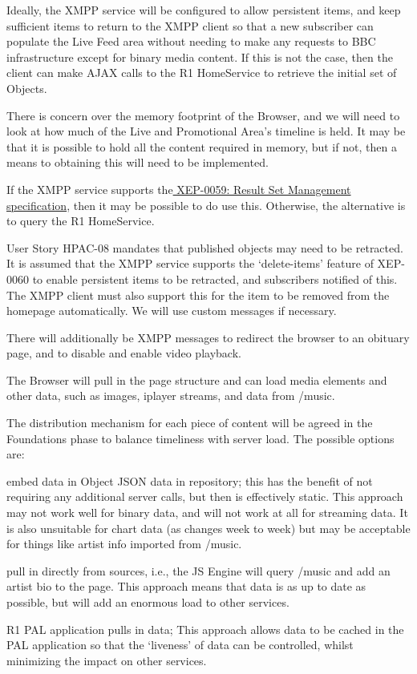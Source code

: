 \documentclass[a4paper, 11pt]{scrreprt}
\begin{document}
Ideally, the XMPP service will be configured to allow persistent items, and keep sufficient items to return to the XMPP client so that a new subscriber can populate the Live Feed area without needing to make any requests to BBC infrastructure except for binary media content. If this is not the case, then the client can make AJAX calls to the R1 HomeService to retrieve the initial set of Objects.

There is concern over the memory footprint of the Browser, and we will need to look at how much of the Live and Promotional Area’s timeline is held. It may be that it is possible to hold all the content required in memory, but if not, then a means to obtaining this will need to be implemented.

If the XMPP service supports the\href{http://www.google.com/url?q=http%3A%2F%2Fxmpp.org%2Fextensions%2Fxep-0059.html&sa=D&sntz=1&usg=AFQjCNHFNftwelaBrA3SHSvujhwXTNrtYA}{ XEP-0059: Result Set Management specification}, then it may be possible to do use this. Otherwise, the alternative is to query the R1 HomeService.

User Story HPAC-08 mandates that published objects may need to be retracted. It is assumed that the XMPP service supports the ‘delete-items’ feature of XEP-0060 to enable persistent items to be retracted, and subscribers notified of this. The XMPP client must also support this for the item to be removed from the homepage automatically. We will use custom messages if necessary.

There will additionally be XMPP messages to redirect the browser to an obituary page, and to disable and enable video playback.

The Browser will pull in the page structure and can load media elements and other data, such as images, iplayer streams, and data from /music.

The distribution mechanism for each piece of content will be agreed in the Foundations phase to balance timeliness with server load. The possible options are:



\begin{tystrul}


\item embed data in Object JSON data in repository; this has the benefit of not requiring any additional server calls, but then is effectively static. This approach may not work well for binary data, and will not work at all for streaming data. It is also unsuitable for chart data (as changes week to week) but may be acceptable for things like artist info imported from /music.

\item pull in directly from sources, i.e., the JS Engine will query /music and add an artist bio to the page. This approach means that data is as up to date as possible, but will add an enormous load to other services.

\item R1 PAL application pulls in data; This approach allows data to be cached in the PAL application so that the ‘liveness’ of data can be controlled, whilst minimizing the impact on other services.

\end{tystrul}
\end{document}

